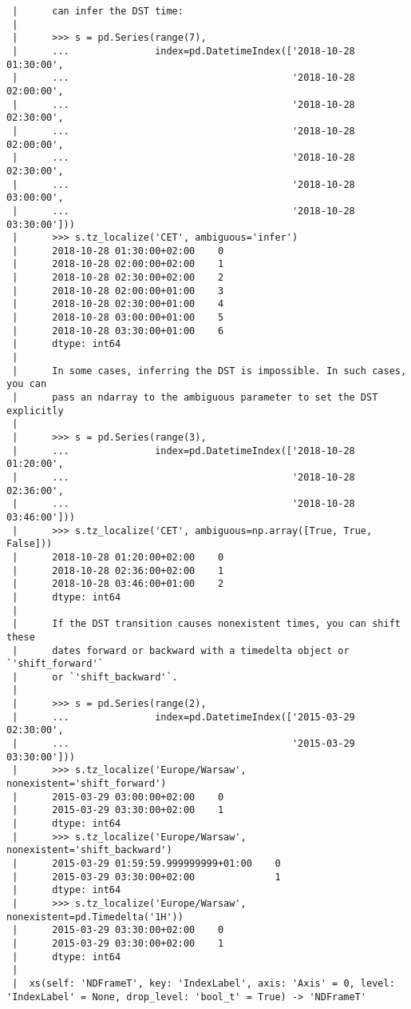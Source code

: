 \documentclass[
  letterpaper,
  DIV=11,
  numbers=noendperiod]{scrreprt}
\begin{document}
\begin{verbatim}
 |      can infer the DST time:
 |      
 |      >>> s = pd.Series(range(7),
 |      ...               index=pd.DatetimeIndex(['2018-10-28 01:30:00',
 |      ...                                       '2018-10-28 02:00:00',
 |      ...                                       '2018-10-28 02:30:00',
 |      ...                                       '2018-10-28 02:00:00',
 |      ...                                       '2018-10-28 02:30:00',
 |      ...                                       '2018-10-28 03:00:00',
 |      ...                                       '2018-10-28 03:30:00']))
 |      >>> s.tz_localize('CET', ambiguous='infer')
 |      2018-10-28 01:30:00+02:00    0
 |      2018-10-28 02:00:00+02:00    1
 |      2018-10-28 02:30:00+02:00    2
 |      2018-10-28 02:00:00+01:00    3
 |      2018-10-28 02:30:00+01:00    4
 |      2018-10-28 03:00:00+01:00    5
 |      2018-10-28 03:30:00+01:00    6
 |      dtype: int64
 |      
 |      In some cases, inferring the DST is impossible. In such cases, you can
 |      pass an ndarray to the ambiguous parameter to set the DST explicitly
 |      
 |      >>> s = pd.Series(range(3),
 |      ...               index=pd.DatetimeIndex(['2018-10-28 01:20:00',
 |      ...                                       '2018-10-28 02:36:00',
 |      ...                                       '2018-10-28 03:46:00']))
 |      >>> s.tz_localize('CET', ambiguous=np.array([True, True, False]))
 |      2018-10-28 01:20:00+02:00    0
 |      2018-10-28 02:36:00+02:00    1
 |      2018-10-28 03:46:00+01:00    2
 |      dtype: int64
 |      
 |      If the DST transition causes nonexistent times, you can shift these
 |      dates forward or backward with a timedelta object or `'shift_forward'`
 |      or `'shift_backward'`.
 |      
 |      >>> s = pd.Series(range(2),
 |      ...               index=pd.DatetimeIndex(['2015-03-29 02:30:00',
 |      ...                                       '2015-03-29 03:30:00']))
 |      >>> s.tz_localize('Europe/Warsaw', nonexistent='shift_forward')
 |      2015-03-29 03:00:00+02:00    0
 |      2015-03-29 03:30:00+02:00    1
 |      dtype: int64
 |      >>> s.tz_localize('Europe/Warsaw', nonexistent='shift_backward')
 |      2015-03-29 01:59:59.999999999+01:00    0
 |      2015-03-29 03:30:00+02:00              1
 |      dtype: int64
 |      >>> s.tz_localize('Europe/Warsaw', nonexistent=pd.Timedelta('1H'))
 |      2015-03-29 03:30:00+02:00    0
 |      2015-03-29 03:30:00+02:00    1
 |      dtype: int64
 |  
 |  xs(self: 'NDFrameT', key: 'IndexLabel', axis: 'Axis' = 0, level: 'IndexLabel' = None, drop_level: 'bool_t' = True) -> 'NDFrameT'

\end{verbatim}
\end{document}
